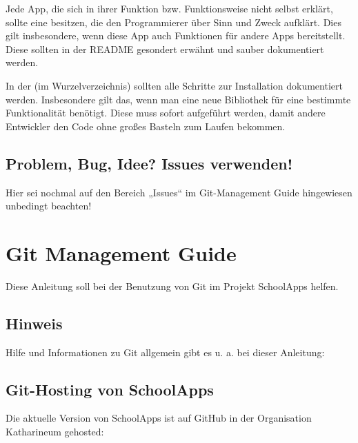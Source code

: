 \documentclass[letterpaper,10pt,ngerman]{sphinxmanual}
\begin{document}
Jede App, die sich in ihrer Funktion bzw. Funktionsweise nicht selbst erklärt, sollte eine  besitzen, die den Programmierer über Sinn und Zweck aufklärt. Dies gilt insbesondere, wenn diese App auch Funktionen für andere Apps bereitstellt. Diese sollten in der README gesondert erwähnt und sauber dokumentiert werden.

In der  (im Wurzelverzeichnis) sollten alle Schritte zur Installation dokumentiert werden. Insbesondere gilt das, wenn man eine neue Bibliothek für eine bestimmte Funktionalität benötigt. Diese muss sofort aufgeführt werden, damit andere Entwickler den Code ohne großes Basteln zum Laufen bekommen.


\section{Problem, Bug, Idee? \textendash{} Issues verwenden!}
\label{\detokenize{dev/dev:problem-bug-idee-issues-verwenden}}
Hier sei nochmal auf den Bereich „Issues“ im Git-Management Guide hingewiesen \textendash{} unbedingt beachten!


\chapter{Git Management Guide}
\label{\detokenize{dev/git:git-management-guide}}\label{\detokenize{dev/git::doc}}
Diese Anleitung soll bei der Benutzung von Git im Projekt SchoolApps helfen.


\section{Hinweis}
\label{\detokenize{dev/git:hinweis}}
Hilfe und Informationen zu Git allgemein gibt es u. a. bei dieser Anleitung:
\begin{quote}

\end{quote}


\section{Git-Hosting von SchoolApps}
\label{\detokenize{dev/git:git-hosting-von-schoolapps}}
Die aktuelle Version von SchoolApps ist auf GitHub in der Organisation Katharineum gehosted:
\begin{quote}

\end{quote}
\end{document}
